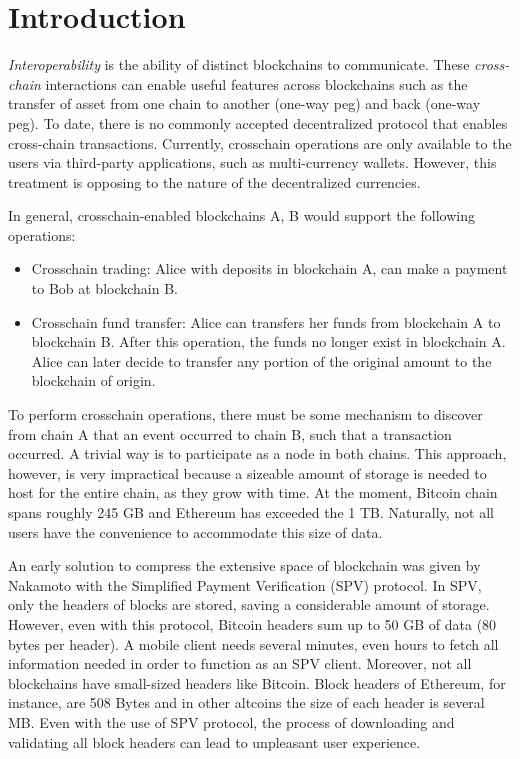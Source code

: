 \section{Introduction}

\emph{Interoperability} is the ability of distinct blockchains to communicate.
These \emph{cross-chain} interactions can enable useful features across
blockchains such as the transfer of asset from one chain to another (one-way
peg) and back (one-way peg). To date, there is no commonly accepted
decentralized protocol that enables cross-chain transactions. Currently,
crosschain operations are only available to the users via third-party
applications, such as multi-currency wallets. However, this treatment is
opposing to the nature of the decentralized currencies.

\noindent

In general, crosschain-enabled blockchains A, B would support the following
operations:

\begin{itemize}
\item Crosschain trading: Alice with deposits in blockchain A, can make a
    payment to Bob at blockchain B.
\item Crosschain fund transfer: Alice can transfers her funds from blockchain A
    to blockchain B. After this operation, the funds no longer exist in
    blockchain A. Alice can later decide to transfer any portion of the
    original amount to the blockchain of origin.
\end{itemize}


\noindent

To perform crosschain operations, there must be some mechanism to discover from
chain A that an event occurred to chain B, such that a transaction occurred. A
trivial way is to participate as a node in both chains. This approach, however,
is very impractical because a sizeable amount of storage is needed to host
for the entire chain, as they grow with time. At the moment, Bitcoin chain
spans roughly 245 GB and Ethereum has exceeded the 1 TB. Naturally, not all
users have the convenience to accommodate this size of data.

An early solution to compress the extensive space of blockchain was given by
Nakamoto with the Simplified Payment Verification (SPV) protocol. In SPV, only
the headers of blocks are stored, saving a considerable amount of storage.
However, even with this protocol, Bitcoin headers sum up to 50 GB of data (80
bytes per header). A mobile client needs several minutes, even hours to fetch
all information needed in order to function as an SPV client. Moreover, not all
blockchains have small-sized headers like Bitcoin. Block headers of Ethereum,
for instance, are 508 Bytes and in other altcoins the size of each header is
several MB. Even with the use of SPV protocol, the process of downloading and
validating all block headers can lead to unpleasant user experience.


